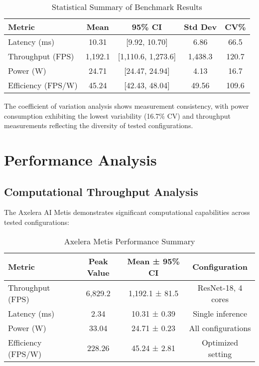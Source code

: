 \documentclass[journal]{IEEEtran}
\begin{document}
\begin{table}[h]
\centering
\caption{Statistical Summary of Benchmark Results}
\begin{tabular}{@{}lcccc@{}}
\toprule
\textbf{Metric} & \textbf{Mean} & \textbf{95\% CI} & \textbf{Std Dev} & \textbf{CV\%} \\
\midrule
Latency (ms) & 10.31 & [9.92, 10.70] & 6.86 & 66.5 \\
Throughput (FPS) & 1,192.1 & [1,110.6, 1,273.6] & 1,438.3 & 120.7 \\
Power (W) & 24.71 & [24.47, 24.94] & 4.13 & 16.7 \\
Efficiency (FPS/W) & 45.24 & [42.43, 48.04] & 49.56 & 109.6 \\
\bottomrule
\end{tabular}
\end{table}

The coefficient of variation analysis shows measurement consistency, with power consumption exhibiting the lowest variability (16.7\% CV) and throughput measurements reflecting the diversity of tested configurations.

\section{Performance Analysis}

\subsection{Computational Throughput Analysis}

The Axelera AI Metis demonstrates significant computational capabilities across tested configurations:

\begin{table}[h]
\centering
\caption{Axelera Metis Performance Summary}
\begin{tabular}{@{}lccc@{}}
\toprule
\textbf{Metric} & \textbf{Peak Value} & \textbf{Mean ± 95\% CI} & \textbf{Configuration} \\
\midrule
Throughput (FPS) & 6,829.2 & 1,192.1 ± 81.5 & ResNet-18, 4 cores \\
Latency (ms) & 2.34 & 10.31 ± 0.39 & Single inference \\
Power (W) & 33.04 & 24.71 ± 0.23 & All configurations \\
Efficiency (FPS/W) & 228.26 & 45.24 ± 2.81 & Optimized setting \\
\bottomrule
\end{tabular}
\end{table}
\end{document}
